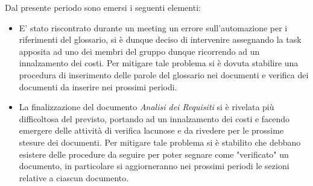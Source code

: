 Dal presente periodo sono emersi i seguenti elementi:
\begin{itemize}
    \item E' stato riscontrato durante un meeting un errore sull'automazione per i riferimenti del glossario, si è dunque deciso di intervenire assegnando la task apposita ad uno dei membri del gruppo dunque ricorrendo ad un innalzamento dei costi. Per mitigare tale problema si è dovuta stabilire una procedura di inserimento delle parole del glossario nei documenti e verifica dei documenti da inserire nei prossimi periodi.
    \item La finalizzazione del documento \emph{Analisi dei Requisiti} si è rivelata più difficoltosa del previsto, portando ad un innalzamento dei costi e facendo emergere delle attività di verifica lacunose e da rivedere per le prossime stesure dei documenti. Per mitigare tale problema si è stabilito che debbano esistere delle procedure da seguire per poter segnare come "verificato" un documento, in particolare si aggiorneranno nei prossimi periodi le sezioni relative a ciascun documento.
\end{itemize}


